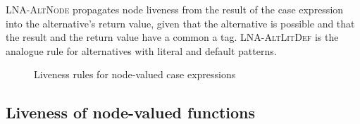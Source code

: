 \documentclass[main.tex]{subfiles}
\begin{document}
	\textsc{LNA-AltNode} propagates node liveness from the result of the case expression into the alternative's return value, given that the alternative is possible and that the result and the return value have a common a tag. \textsc{LNA-AltLitDef} is the analogue rule for alternatives with literal and default patterns.

  \begin{figure}[h]
  \caption{Liveness rules for node-valued case expressions}
  \label{fig:lva-case}
  \end{figure}

	\subsection{Liveness of node-valued functions}
\end{document}
